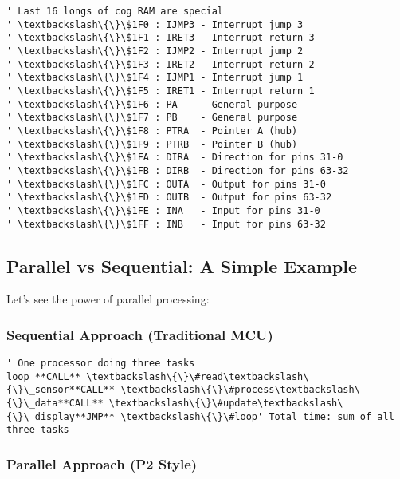 \documentclass[11pt]{book}
\begin{document}
\begin{lstlisting}
' Last 16 longs of cog RAM are special
' \textbackslash\{\}\$1F0 : IJMP3 - Interrupt jump 3
' \textbackslash\{\}\$1F1 : IRET3 - Interrupt return 3
' \textbackslash\{\}\$1F2 : IJMP2 - Interrupt jump 2
' \textbackslash\{\}\$1F3 : IRET2 - Interrupt return 2
' \textbackslash\{\}\$1F4 : IJMP1 - Interrupt jump 1
' \textbackslash\{\}\$1F5 : IRET1 - Interrupt return 1
' \textbackslash\{\}\$1F6 : PA    - General purpose
' \textbackslash\{\}\$1F7 : PB    - General purpose
' \textbackslash\{\}\$1F8 : PTRA  - Pointer A (hub)
' \textbackslash\{\}\$1F9 : PTRB  - Pointer B (hub)
' \textbackslash\{\}\$1FA : DIRA  - Direction for pins 31-0
' \textbackslash\{\}\$1FB : DIRB  - Direction for pins 63-32
' \textbackslash\{\}\$1FC : OUTA  - Output for pins 31-0
' \textbackslash\{\}\$1FD : OUTB  - Output for pins 63-32
' \textbackslash\{\}\$1FE : INA   - Input for pins 31-0
' \textbackslash\{\}\$1FF : INB   - Input for pins 63-32
\end{lstlisting}

\hypertarget{parallel-vs-sequential-a-simple-example}{%
\subsection{Parallel vs Sequential: A Simple
Example}\label{parallel-vs-sequential-a-simple-example}}

Let's see the power of parallel processing:

\hypertarget{sequential-approach-traditional-mcu}{%
\subsubsection{Sequential Approach (Traditional
MCU)}\label{sequential-approach-traditional-mcu}}

\begin{lstlisting}
' One processor doing three tasks
loop **CALL** \textbackslash\{\}\#read\textbackslash\{\}\_sensor**CALL** \textbackslash\{\}\#process\textbackslash\{\}\_data**CALL** \textbackslash\{\}\#update\textbackslash\{\}\_display**JMP** \textbackslash\{\}\#loop' Total time: sum of all three tasks
\end{lstlisting}

\hypertarget{parallel-approach-p2-style}{%
\subsubsection{Parallel Approach (P2
Style)}\label{parallel-approach-p2-style}}
\end{document}
